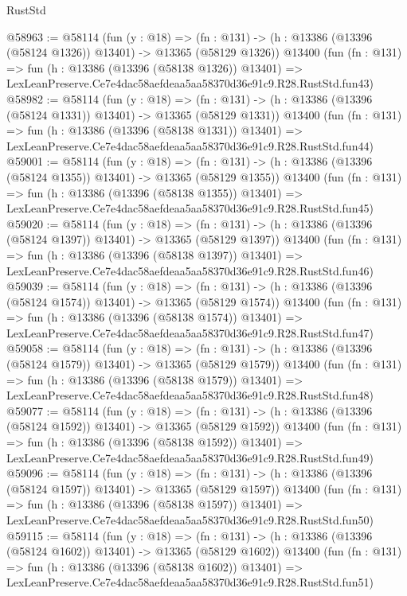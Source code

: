 \begin{lexlean}{RustStd}
\begin{coremodule}
@58963 := @58114
    (fun (y : @18) =>
    (fn : @131) -> (h : @13386 (@13396 (@58124 @1326)) @13401) -> @13365 (@58129 @1326))
    @13400
    (fun (fn : @131) =>
    fun (h : @13386 (@13396 (@58138 @1326)) @13401) =>
    LexLeanPreserve.Ce7e4dac58aefdeaa5aa58370d36e91c9.R28.RustStd.fun43)
@58982 := @58114
    (fun (y : @18) =>
    (fn : @131) -> (h : @13386 (@13396 (@58124 @1331)) @13401) -> @13365 (@58129 @1331))
    @13400
    (fun (fn : @131) =>
    fun (h : @13386 (@13396 (@58138 @1331)) @13401) =>
    LexLeanPreserve.Ce7e4dac58aefdeaa5aa58370d36e91c9.R28.RustStd.fun44)
@59001 := @58114
    (fun (y : @18) =>
    (fn : @131) -> (h : @13386 (@13396 (@58124 @1355)) @13401) -> @13365 (@58129 @1355))
    @13400
    (fun (fn : @131) =>
    fun (h : @13386 (@13396 (@58138 @1355)) @13401) =>
    LexLeanPreserve.Ce7e4dac58aefdeaa5aa58370d36e91c9.R28.RustStd.fun45)
@59020 := @58114
    (fun (y : @18) =>
    (fn : @131) -> (h : @13386 (@13396 (@58124 @1397)) @13401) -> @13365 (@58129 @1397))
    @13400
    (fun (fn : @131) =>
    fun (h : @13386 (@13396 (@58138 @1397)) @13401) =>
    LexLeanPreserve.Ce7e4dac58aefdeaa5aa58370d36e91c9.R28.RustStd.fun46)
@59039 := @58114
    (fun (y : @18) =>
    (fn : @131) -> (h : @13386 (@13396 (@58124 @1574)) @13401) -> @13365 (@58129 @1574))
    @13400
    (fun (fn : @131) =>
    fun (h : @13386 (@13396 (@58138 @1574)) @13401) =>
    LexLeanPreserve.Ce7e4dac58aefdeaa5aa58370d36e91c9.R28.RustStd.fun47)
@59058 := @58114
    (fun (y : @18) =>
    (fn : @131) -> (h : @13386 (@13396 (@58124 @1579)) @13401) -> @13365 (@58129 @1579))
    @13400
    (fun (fn : @131) =>
    fun (h : @13386 (@13396 (@58138 @1579)) @13401) =>
    LexLeanPreserve.Ce7e4dac58aefdeaa5aa58370d36e91c9.R28.RustStd.fun48)
@59077 := @58114
    (fun (y : @18) =>
    (fn : @131) -> (h : @13386 (@13396 (@58124 @1592)) @13401) -> @13365 (@58129 @1592))
    @13400
    (fun (fn : @131) =>
    fun (h : @13386 (@13396 (@58138 @1592)) @13401) =>
    LexLeanPreserve.Ce7e4dac58aefdeaa5aa58370d36e91c9.R28.RustStd.fun49)
@59096 := @58114
    (fun (y : @18) =>
    (fn : @131) -> (h : @13386 (@13396 (@58124 @1597)) @13401) -> @13365 (@58129 @1597))
    @13400
    (fun (fn : @131) =>
    fun (h : @13386 (@13396 (@58138 @1597)) @13401) =>
    LexLeanPreserve.Ce7e4dac58aefdeaa5aa58370d36e91c9.R28.RustStd.fun50)
@59115 := @58114
    (fun (y : @18) =>
    (fn : @131) -> (h : @13386 (@13396 (@58124 @1602)) @13401) -> @13365 (@58129 @1602))
    @13400
    (fun (fn : @131) =>
    fun (h : @13386 (@13396 (@58138 @1602)) @13401) =>
    LexLeanPreserve.Ce7e4dac58aefdeaa5aa58370d36e91c9.R28.RustStd.fun51)

\end{coremodule}
\end{lexlean}
